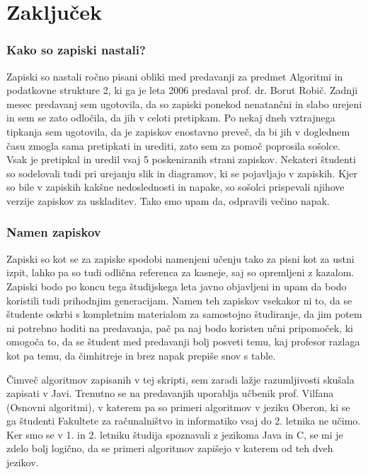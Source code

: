 \documentclass[a4paper,10pt]{article}
\begin{document}
\part{Zaklju\v cek}

\section{Kako so zapiski nastali?}
Zapiski so nastali ro\v cno pisani obliki med predavanji za predmet Algoritmi in podatkovne strukture 2, ki ga je leta 2006 predaval prof. dr. Borut Robi\v c. Zadnji mesec predavanj sem ugotovila, da so zapiski ponekod nenatan\v cni in slabo urejeni in sem se zato odlo\v cila, da jih v celoti pretipkam. Po nekaj dneh vztrajnega tipkanja sem ugotovila, da je zapiskov enostavno preve\v c, da bi jih v doglednem \v casu zmogla sama pretipkati in urediti, zato sem za pomo\v c poprosila so\v solce. Vsak je pretipkal in uredil vsaj 5 poskeniranih strani zapiskov. Nekateri \v studenti so sodelovali tudi pri urejanju slik in diagramov, ki se pojavljajo v zapiskih. Kjer so bile v zapiskih kak\v sne nedoslednosti in napake, so so\v solci prispevali njihove verzije zapiskov za uskladitev. Tako smo upam da, odpravili ve\v cino napak.

\section{Namen zapiskov}
Zapiski so kot se za zapiske spodobi namenjeni u\v cenju tako za pisni kot za ustni izpit, lahko pa so tudi odli\v cna referenca za kasneje, saj so opremljeni z kazalom. Zapiski bodo po koncu tega \v studijskega leta javno objavljeni in upam da bodo koristili tudi prihodnjim generacijam. Namen teh zapiskov vsekakor ni to, da se \v studente oskrbi s kompletnim materialom za samostojno \v studiranje, da jim potem ni potrebno hoditi na predavanja, pa\v c pa naj bodo koristen u\v cni pripomo\v cek, ki omogo\v ca to, da se \v student med predavanji bolj posveti temu, kaj profesor razlaga kot pa temu, da \v cimhitreje in brez napak prepi\v se snov s table.

\v Cimve\v c algoritmov zapisanih v tej skripti, sem zaradi la\v zje razumljivosti sku\v sala zapisati v Javi. Trenutno se na predavanjih uporablja u\v cbenik prof. Vilfana (Osnovni algoritmi), v katerem pa so primeri algoritmov v jeziku Oberon, ki se ga \v studenti Fakultete za ra\v cunalni\v stvo in informatiko vsaj do 2. letnika ne u\v cimo. Ker smo se v 1. in 2. letniku \v studija spoznavali z jezikoma Java in C, se mi je zdelo bolj logi\v cno, da se primeri algoritmov zapi\v sejo v katerem od teh dveh jezikov.
\end{document}
